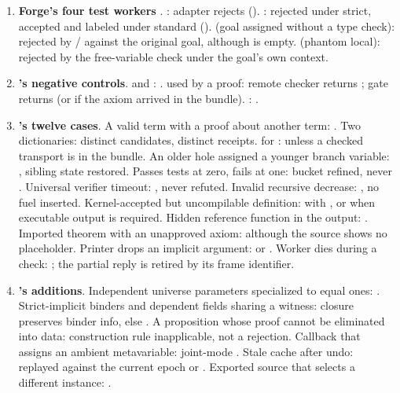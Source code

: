 \begin{enumerate}
\item \textbf{Forge's four test workers} \cite{forge}. : adapter rejects (). : rejected under strict, accepted and labeled under standard ().  (goal assigned  without a type check): rejected by / against the original goal, although  is empty.  (phantom local): rejected by the free-variable check under the goal's own context.
\item \textbf{'s negative controls}.  and : .  used by a proof: remote checker returns ; gate returns  (or  if the axiom arrived in the bundle). : .
\item \textbf{'s twelve cases}. A valid term with a proof about another term: . Two  dictionaries: distinct candidates, distinct receipts.  for :  unless a checked transport is in the bundle. An older hole assigned a younger branch variable: , sibling state restored. Passes tests at zero, fails at one: bucket refined, never . Universal verifier timeout: , never refuted. Invalid recursive decrease: , no fuel inserted. Kernel-accepted but uncompilable definition:  with , or  when executable output is required. Hidden reference function in the output: . Imported theorem with an unapproved axiom:  although the source shows no placeholder. Printer drops an implicit argument:  or . Worker dies during a check: ; the partial reply is retired by its frame identifier.
\item \textbf{'s additions}. Independent universe parameters specialized to equal ones: . Strict-implicit binders and dependent fields sharing a witness: closure preserves binder info, else . A proposition whose proof cannot be eliminated into data: construction rule inapplicable, not a rejection. Callback that assigns an ambient metavariable: joint-mode . Stale cache after undo: replayed against the current epoch or . Exported source that selects a different instance: .

\end{enumerate}
